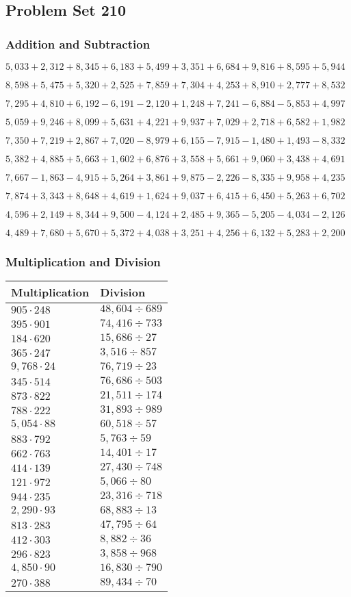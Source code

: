 \hypertarget{problem-set-210}{%
\subsection{Problem Set 210}\label{problem-set-210}}

\hypertarget{addition-and-subtraction}{%
\subsubsection{Addition and
Subtraction}\label{addition-and-subtraction}}

\(5,033+2,312+8,345+6,183+5,499+3,351+6,684+9,816+8,595+5,944\)

\(8,598+5,475+5,320+2,525+7,859+7,304+4,253+8,910+2,777+8,532\)

\(7,295+4,810+6,192-6,191-2,120+1,248+7,241-6,884-5,853+4,997\)

\(5,059+9,246+8,099+5,631+4,221+9,937+7,029+2,718+6,582+1,982\)

\(7,350+7,219+2,867+7,020-8,979+6,155-7,915-1,480+1,493-8,332\)

\(5,382+4,885+5,663+1,602+6,876+3,558+5,661+9,060+3,438+4,691\)

\(7,667-1,863-4,915+5,264+3,861+9,875-2,226-8,335+9,958+4,235\)

\(7,874+3,343+8,648+4,619+1,624+9,037+6,415+6,450+5,263+6,702\)

\(4,596+2,149+8,344+9,500-4,124+2,485+9,365-5,205-4,034-2,126\)

\(4,489+7,680+5,670+5,372+4,038+3,251+4,256+6,132+5,283+2,200\)

\hypertarget{multiplication-and-division}{%
\subsubsection{Multiplication and
Division}\label{multiplication-and-division}}

\begin{longtable}[]{@{}ll@{}}
\toprule
Multiplication & Division\tabularnewline
\midrule
\endhead
\(905\cdot248\) & \(48,604÷689\)\tabularnewline
\(395\cdot901\) & \(74,416÷733\)\tabularnewline
\(184\cdot620\) & \(15,686÷27\)\tabularnewline
\(365\cdot247\) & \(3,516÷857\)\tabularnewline
\(9,768\cdot24\) & \(76,719÷23\)\tabularnewline
\(345\cdot514\) & \(76,686÷503\)\tabularnewline
\(873\cdot822\) & \(21,511÷174\)\tabularnewline
\(788\cdot222\) & \(31,893÷989\)\tabularnewline
\(5,054\cdot88\) & \(60,518÷57\)\tabularnewline
\(883\cdot792\) & \(5,763÷59\)\tabularnewline
\(662\cdot763\) & \(14,401÷17\)\tabularnewline
\(414\cdot139\) & \(27,430÷748\)\tabularnewline
\(121\cdot972\) & \(5,066÷80\)\tabularnewline
\(944\cdot235\) & \(23,316÷718\)\tabularnewline
\(2,290\cdot93\) & \(68,883÷13\)\tabularnewline
\(813\cdot283\) & \(47,795÷64\)\tabularnewline
\(412\cdot303\) & \(8,882÷36\)\tabularnewline
\(296\cdot823\) & \(3,858÷968\)\tabularnewline
\(4,850\cdot90\) & \(16,830÷790\)\tabularnewline
\(270\cdot388\) & \(89,434÷70\)\tabularnewline
\bottomrule
\end{longtable}
